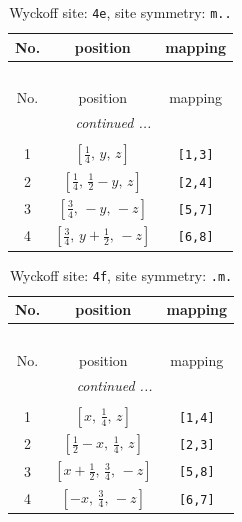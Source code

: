 \documentclass[fleqn,8pt]{jsarticle}
\begin{document}
\renewcommand{\arraystretch}{1.2}
\begin{longtable}{ccc}
\caption{Wyckoff site: {\tt 4e}, site symmetry: {\tt m..}}
 \\
 \hline \hline
No. & position & mapping \\ \hline \endfirsthead

\multicolumn{2}{l}{\tablename\ \thetable{}} \\
 \hline \hline
No. & position & mapping \\ \hline \endhead

 \hline \hline
\multicolumn{2}{r}{\footnotesize\it continued ...} \\ \endfoot

 \hline \hline
\multicolumn{2}{r}{} \\ \endlastfoot

1 & $\left[ \frac{1}{4},\, y,\, z \right]$ & {\tt [1,3]} \\ \hline
2 & $\left[ \frac{1}{4},\, \frac{1}{2} - y,\, z \right]$ & {\tt [2,4]} \\ \hline
3 & $\left[ \frac{3}{4},\, - y,\, - z \right]$ & {\tt [5,7]} \\ \hline
4 & $\left[ \frac{3}{4},\, y + \frac{1}{2},\, - z \right]$ & {\tt [6,8]} \\
\end{longtable}
\renewcommand{\arraystretch}{1.2}
\begin{longtable}{ccc}
\caption{Wyckoff site: {\tt 4f}, site symmetry: {\tt .m.}}
 \\
 \hline \hline
No. & position & mapping \\ \hline \endfirsthead

\multicolumn{2}{l}{\tablename\ \thetable{}} \\
 \hline \hline
No. & position & mapping \\ \hline \endhead

 \hline \hline
\multicolumn{2}{r}{\footnotesize\it continued ...} \\ \endfoot

 \hline \hline
\multicolumn{2}{r}{} \\ \endlastfoot

1 & $\left[ x,\, \frac{1}{4},\, z \right]$ & {\tt [1,4]} \\ \hline
2 & $\left[ \frac{1}{2} - x,\, \frac{1}{4},\, z \right]$ & {\tt [2,3]} \\ \hline
3 & $\left[ x + \frac{1}{2},\, \frac{3}{4},\, - z \right]$ & {\tt [5,8]} \\ \hline
4 & $\left[ - x,\, \frac{3}{4},\, - z \right]$ & {\tt [6,7]} \\
\end{longtable}
\end{document}
